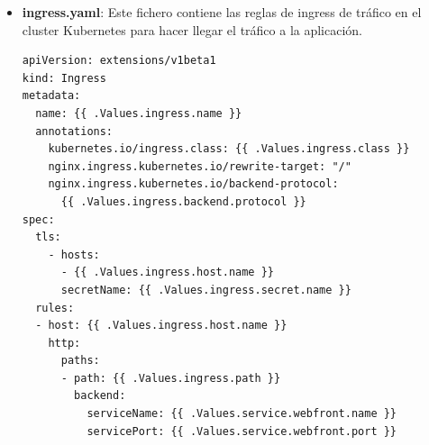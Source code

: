 \documentclass[12pt,spanish]{article}
\begin{document}
\begin{itemize}
\begin{verbatim}
metadata:
  name: {{ .Values.service.mysqlsrv.name }}
  labels:
    chart: {{ .Chart.Name }}-{{ .Chart.Version | replace "+" "_" }}
spec:
  type: {{ .Values.service.mysqlsrv.type }}
  ports:
  - name: mysql-port
    port: {{ .Values.service.mysqlsrv.port }}
    targetPort: {{ .Values.service.mysqlsrv.port }}
  selector:
    app: {{ .Values.service.mysqlsrv.name }}
---
apiVersion: apps/v1beta1
kind: Deployment
metadata:
  name: {{ .Values.service.internalsvc.name }}
  labels:
    chart: {{ .Chart.Name }}-{{ .Chart.Version | replace "+" "_" }}
spec:
  replicas: {{ .Values.replicas.internalsvc.replicaCount }}
  strategy:
    type: Recreate
  template:
    metadata:
      labels:
        app: {{ .Values.service.internalsvc.name }}
      annotations:
        sidecar.istio.io/inject: "false"
    spec:
      containers:
      - name: {{ .Chart.Name }}
        image: {{ .Values.image.internalsvc.repository }}/
               {{ .Values.image.internalsvc.name }}:
               {{ .Values.image.internalsvc.tag }}
        imagePullPolicy: {{ .Values.image.internalsvc.pullPolicy }}
        ports:
        - containerPort: {{ .Values.service.internalsvc.port }}
        env:
        - name: LOGLEVEL
          value: {{ .Values.env.logLevel | quote}}
        resources:
{{ toYaml .Values.resources | indent 10 }}
      restartPolicy: Always
---
apiVersion: v1
kind: Service
metadata:
  name: {{ .Values.service.internalsvc.name }}
  labels:
    chart: {{ .Chart.Name }}-{{ .Chart.Version | replace "+" "_" }}
spec:
  type: {{ .Values.service.internalsvc.type }}
  ports:
  - name: http-spring
    port: {{ .Values.service.internalsvc.port }}
  selector:
    app: {{ .Values.service.internalsvc.name }}
\end{verbatim}
\item{\textbf{ingress.yaml}}: Este fichero contiene las reglas de ingress de tráfico en el cluster Kubernetes para hacer llegar el tráfico a la aplicación.
\begin{verbatim}
apiVersion: extensions/v1beta1
kind: Ingress
metadata:
  name: {{ .Values.ingress.name }}
  annotations:
    kubernetes.io/ingress.class: {{ .Values.ingress.class }}
    nginx.ingress.kubernetes.io/rewrite-target: "/"
    nginx.ingress.kubernetes.io/backend-protocol:
      {{ .Values.ingress.backend.protocol }}
spec:
  tls:
    - hosts:
      - {{ .Values.ingress.host.name }}
      secretName: {{ .Values.ingress.secret.name }}
  rules:
  - host: {{ .Values.ingress.host.name }}
    http:
      paths:
      - path: {{ .Values.ingress.path }}
        backend:
          serviceName: {{ .Values.service.webfront.name }}
          servicePort: {{ .Values.service.webfront.port }}
\end{verbatim}
\end{itemize}
\end{document}

